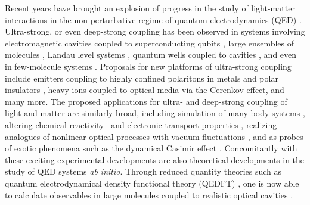 \documentclass[aps,prl,twocolumn,
	groupedaddress,superscriptaddress,
	amsfonts,amssymb,amsmath,floatfix,
	citeautoscript]{revtex4-1}
\begin{document}
Recent years have brought an explosion of progress in the study of light-matter interactions in the non-perturbative regime of quantum electrodynamics (QED) \cite{flick7strong,ruggenthaler2017b,forn2018ultrastrong,kockum2018ultrastrong}. Ultra-strong, or even deep-strong coupling has been observed in systems involving electromagnetic cavities coupled to superconducting qubits \cite{blais2004,wallraff2004,yoshihara2017superconducting,forn2017ultrastrong}, large ensembles of molecules \cite{hutchison2012,hutchison2013,coles2014,coles2014b,shalabney2015coherent, thomas2016,ebbesen2016}, Landau level systems \cite{hagenmuller2010ultrastrong,scalari2012ultrastrong,zhang2016collective},  quantum wells coupled to cavities \cite{todorov2010ultrastrong,geiser2012ultrastrong}, and even in few-molecule systems \cite{benz2016,chikkaraddy2016}. Proposals for new platforms of ultra-strong coupling include emitters coupling to highly confined polaritons in metals and polar insulators \cite{rivera2016shrinking}, heavy ions coupled to optical media via the Cerenkov effect, and many more. The proposed applications for ultra- and deep-strong coupling of light and matter are similarly broad, including simulation of many-body systems \cite{forn2018ultrastrong}, altering chemical reactivity~\cite{hutchison2012, thomas2016,flick2017} and electronic transport properties \cite{orgiu2015}, realizing analogues of nonlinear optical processes with vacuum fluctuations \cite{kockum2017deterministic}, and as probes of exotic phenomena such as the dynamical Casimir effect \cite{ciuti2005quantum}. Concomitantly with these exciting experimental developments are also theoretical developments in the study of QED systems \textit{ab initio}. Through reduced quantity theories such as quantum electrodynamical density functional theory (QEDFT) \cite{ruggenthaler2014,pellegrini2015,flick2015,dimitrov2017,flick2018,flick2018b,schaefer2018}, one is now able to calculate observables in large molecules coupled to realistic optical cavities  \cite{flick2017c}.
\end{document}
